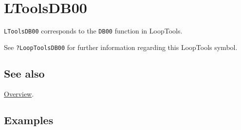 \documentclass[../FeynHelpersManual.tex]{subfiles}
\begin{document}
\hypertarget{ltoolsdb00}{
\section{LToolsDB00}\label{ltoolsdb00}}

\texttt{LToolsDB00} corresponds to the \texttt{DB00} function in
LoopTools.

See \texttt{?LoopTools\textasciigrave DB00} for further information
regarding this LoopTools symbol.

\subsection{See also}

\hyperlink{toc}{Overview}.

\subsection{Examples}
\end{document}
